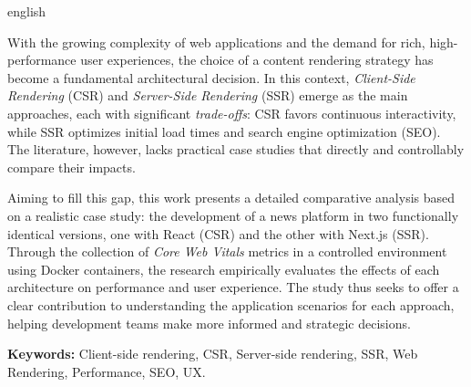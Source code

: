 \begin{resumo}[Abstract]
\begin{otherlanguage*}{english}
    
With the growing complexity of web applications and the demand for rich, high-performance user experiences, the choice of a content rendering strategy has become a fundamental architectural decision. In this context, \textit{Client-Side Rendering} (CSR) and \textit{Server-Side Rendering} (SSR) emerge as the main approaches, each with significant \textit{trade-offs}: CSR favors continuous interactivity, while SSR optimizes initial load times and search engine optimization (SEO). The literature, however, lacks practical case studies that directly and controllably compare their impacts.

Aiming to fill this gap, this work presents a detailed comparative analysis based on a realistic case study: the development of a news platform in two functionally identical versions, one with React (CSR) and the other with Next.js (SSR). Through the collection of \textit{Core Web Vitals} metrics in a controlled environment using Docker containers, the research empirically evaluates the effects of each architecture on performance and user experience. The study thus seeks to offer a clear contribution to understanding the application scenarios for each approach, helping development teams make more informed and strategic decisions.

\textbf{Keywords:} Client-side rendering, CSR, Server-side rendering, SSR, Web Rendering, Performance, SEO, UX.
\end{otherlanguage*}
\end{resumo}